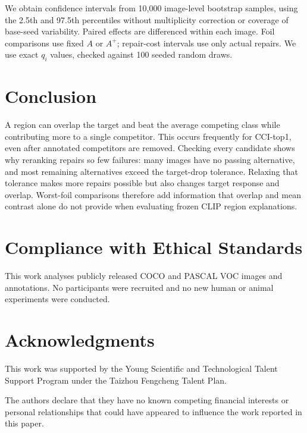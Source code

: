 \documentclass[10pt]{article}
\begin{document}
We obtain confidence intervals from 10,000 image-level bootstrap samples,
using the 2.5th and 97.5th percentiles without multiplicity correction
or coverage of base-seed variability.
Paired effects are differenced within each image. Foil comparisons use
fixed $A$ or $A^+$; repair-cost intervals use only actual repairs.
We use exact $q_i$ values, checked against 100 seeded random draws.

\section{Conclusion}
A region can overlap the target and beat the average competing class while
contributing more to a single competitor. This occurs frequently for
CCI-top1, even after annotated competitors are removed. Checking every
candidate shows why reranking repairs so few failures: many images have
no passing alternative, and most remaining alternatives exceed the
target-drop tolerance. Relaxing that tolerance makes more repairs possible
but also changes target response and overlap. Worst-foil comparisons
therefore add information that overlap and mean contrast alone do not
provide when evaluating frozen CLIP region explanations.

\clearpage
\balance

\section*{Compliance with Ethical Standards}
This work analyses publicly released COCO and PASCAL VOC images and
annotations. No participants were recruited and no new human or animal
experiments were conducted.
\section*{Acknowledgments}
This work was supported by the Young Scientific and Technological Talent Support Program under the Taizhou Fengcheng Talent Plan.

The authors declare that they have no known competing financial interests or personal relationships that could have appeared to influence the work reported in this paper.
\end{document}
